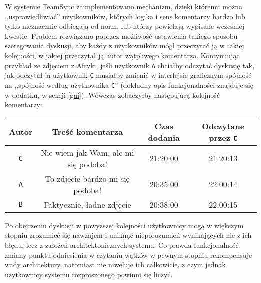 W systemie TeamSync zaimplementowano mechanizm, dzięki któremu można ,,usprawiedliwiać'' użytkowników, których logika i sens komentarzy bardzo lub tylko nieznacznie odbiegają od norm, lub którzy powielają wypisane wcześniej kwestie. Problem rozwiązano poprzez możliwość ustawienia takiego sposobu szeregowania dyskusji, aby każdy z użytkowników mógł przeczytać ją w takiej kolejności, w jakiej przeczytał ją autor wątpliwego komentarza. Kontynuując przykład ze zdjęciem z Afryki, jeśli użytkownik \texttt{A} chciałby odczytać dyskusję tak, jak odczytał ją użytkownik \texttt{C} musiałby zmienić w interfejsie graficznym spójność na ,,spójność według użytkownika \texttt{C}'' (dokładny opis funkcjonalności znajduje się w dodatku, w sekcji \ref{gui}). Wówczas zobaczyłby następującą kolejność komentarzy:

\vspace{5px}
\begin{center}
\begin{tabular}{c | c | c | c}
 \textbf{Autor} & \textbf{Treść komentarza} & \textbf{Czas dodania} & \textbf{Odczytane przez \texttt{C}}\\
 \hline
 \texttt{C} & Nie wiem jak Wam, ale mi się podoba! & 21:20:00 & 21:20:13 \\
 \texttt{A} & To zdjęcie bardzo mi się podoba! & 20:35:00 & 22:00:14 \\
 \texttt{B} & Faktycznie, ładne zdjęcie & 20:38:00 & 22:00:15
\end{tabular}
\end{center}
\vspace{5px}

Po obejrzeniu dyskusji w powyższej kolejności użytkownicy mogą w większym stopniu zrozumieć się nawzajem i uniknąć nieporozumień wynikających nie z ich błędu, lecz z założeń architektonicznych systemu. Co prawda funkcjonalność zmiany punktu odniesienia w czytaniu wątków w pewnym stopniu rekompensuje wady architektury, natomiast nie niweluje ich całkowicie, z czym jednak użytkownicy systemu rozproszonego powinni się liczyć.